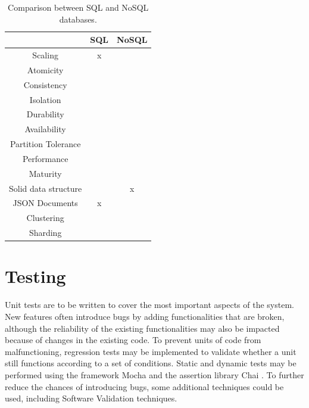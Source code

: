 \begin{table}[htbp!]
	\centering
	\begin{tabular}{c|c|c}
		\toprule
		& SQL & NoSQL \\
		\midrule
		Scaling & x & \checkmark\checkmark \\
		Atomicity & \checkmark & \checkmark \\
		Consistency & \checkmark\checkmark & \checkmark \\
		Isolation & \checkmark & \checkmark \\
		Durability & \checkmark & \checkmark \\
		Availability & \checkmark & \checkmark\checkmark \\
		Partition Tolerance & \checkmark & \checkmark \\
		Performance & \checkmark & \checkmark\checkmark \\
		Maturity & \checkmark\checkmark & \checkmark \\
		Solid data structure & \checkmark\checkmark & x \\
		JSON Documents & x & \checkmark \\
		Clustering & \checkmark & \checkmark \\
		Sharding & \checkmark & \checkmark \\
		\bottomrule
	\end{tabular}
	\caption[Databases Comparison]{Comparison between SQL and NoSQL databases.}
	\label{tab:databases-comparison}
\end{table}

%
\section{Testing}
Unit tests are to be written to cover the most important aspects of the system. New features often introduce bugs by adding functionalities that are broken, although the reliability of the existing functionalities may also be impacted because of changes in the existing code. To prevent units of code from malfunctioning, regression tests may be implemented to validate whether a unit still functions according to a set of conditions. Static and dynamic tests may be performed using the framework Mocha \cite{mocha} and the assertion library Chai \cite{chai}. To further reduce the chances of introducing bugs, some additional techniques could be used, including Software Validation techniques.

